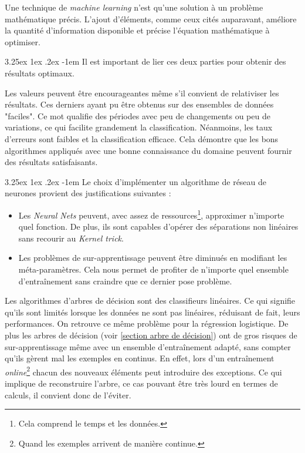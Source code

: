 \documentclass[a4paper, 11pt]{article}
\makeatletter
\renewcommand\paragraph{\@startsection{paragraph}{5}{\z@}%
  {3.25ex \@plus1ex \@minus.2ex}%
  {-1em}%
  {\normalfont\normalsize\bfseries}}
\makeatother
\begin{document}
Une technique de \textit{machine learning} n'est qu'une solution à un problème mathématique précis. L'ajout d'éléments,
comme ceux cités auparavant, améliore la quantité d'information disponible et précise l'équation mathématique à optimiser.

\paragraph{}
Il est important de lier ces deux parties pour obtenir des résultats optimaux.

Les valeurs peuvent être encourageantes même s'il convient de relativiser les résultats. Ces derniers ayant pu
être obtenus sur des ensembles de données "faciles". Ce mot qualifie des périodes avec peu de changements ou peu de
variations, ce qui facilite grandement la classification.
Néanmoins, les taux d'erreurs sont faibles et la classification efficace.
Cela démontre que les bons algorithmes appliqués avec une bonne connaissance du domaine peuvent fournir des résultats satisfaisants. 

\paragraph{}
Le choix d'implémenter un algorithme de réseau de neurones provient des justifications suivantes :
\begin{itemize}
 \item Les \textit{Neural Nets} peuvent, avec assez de ressources\footnote{Cela comprend le temps et les données.}, approximer n'importe
 quel fonction. De plus, ils sont capables d'opérer des séparations non linéaires sans recourir au \textit{Kernel trick}.
 \item Les problèmes de sur-apprentissage peuvent être diminués en modifiant les méta-paramètres. Cela nous permet de profiter
 de n'importe quel ensemble d'entraînement sans craindre que ce dernier pose problème.
\end{itemize}

Les algorithmes d'arbres de décision sont des classifieurs linéaires. Ce qui signifie qu'ils sont limités
lorsque les données ne sont pas linéaires, réduisant de fait, leurs performances. On retrouve ce même problème
pour la régression logistique. De plus les arbres de décision (voir \ref{section arbre de décision}) ont de gros risques
de sur-apprentissage même avec un ensemble d'entraînement adapté, sans compter qu'ils gèrent mal les exemples en continus.
En effet, lors d'un entraînement \textit{online}\footnote{Quand les exemples arrivent de manière continue.} chacun des nouveaux
éléments peut introduire des exceptions. Ce qui implique de reconstruire l'arbre, ce cas pouvant être très lourd en termes
de calculs, il convient donc de l'éviter.
\end{document}
